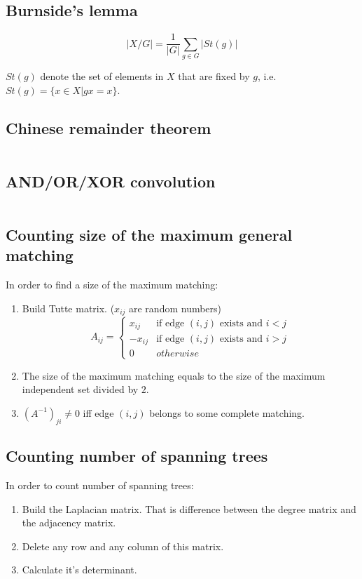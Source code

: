 \documentclass{article}
\begin{document}
\subsection{Burnside's lemma}
$$|X/G| = \frac{1}{|G|}\sum\limits_{g \in G}|St(g)|$$

$St(g)$ denote the set of elements in $X$ that are fixed by $g$, i.e. $St(g) = \{x \in X | gx = x\}$.
\subsection{Chinese remainder theorem}
\inputminted[mathescape, breaklines, breakafter=(, tabsize=2, frame=lines, showtabs, tab=|\ , tabcolor=lightgray]{c++}{./numeric/chinese-remainder-theorem/chinese-remainder-theorem.cpp}
\subsection{AND/OR/XOR convolution}
\inputminted[mathescape, breaklines, breakafter=(, tabsize=2, frame=lines, showtabs, tab=|\ , tabcolor=lightgray]{c++}{./numeric/convolutions/convolutions.cpp}
\subsection{Counting size of the maximum general matching}
In order to find a size of the maximum matching:
\begin{enumerate}
	\item Build Tutte matrix. ($x_{ij}$ are random numbers)
	$$A_{ij} = 
	\begin{cases} 
	x_{ij} & \text{if edge $(i, j)$ exists and $i < j$} \\
	-x_{ij} & \text{if edge $(i, j)$ exists and $i > j$} \\
	0 & otherwise
	\end{cases}$$
	\item The size of the maximum matching equals to the size of the maximum independent set divided by $2$.
	\item $(A^{-1})_{ji} \neq 0$ iff edge $(i, j)$ belongs to some complete matching.
\end{enumerate}
\subsection{Counting number of spanning trees}
In order to count number of spanning trees:
\begin{enumerate}
	\item Build the Laplacian matrix. That is difference between the degree matrix and the adjacency matrix.
	\item Delete any row and any column of this matrix.
	\item Calculate it's determinant.
\end{enumerate}
\end{document}
